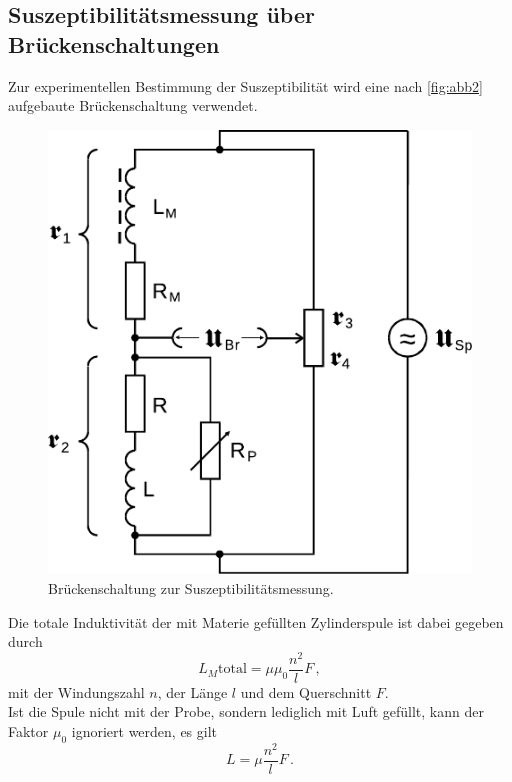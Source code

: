 \subsection{Suszeptibilitätsmessung über Brückenschaltungen}

Zur experimentellen Bestimmung der Suszeptibilität wird eine nach \autoref{fig:abb2} aufgebaute Brückenschaltung verwendet.

\begin{figure}
    \centering
    \includegraphics{figures/Abb_2.pdf}
    \caption{Brückenschaltung zur Suszeptibilitätsmessung\cite{ap07}.}
    \label{fig:abb2}
\end{figure}

Die totale Induktivität der mit Materie gefüllten Zylinderspule ist dabei gegeben durch
\begin{equation}
    L_M\text{total} = \mu \mu_0 \dfrac{n^2}{l} F \,,
    \label{eq:induspu}
\end{equation}
mit der Windungszahl $n$, der Länge $l$ und dem Querschnitt $F$. \\

Ist die Spule nicht mit der Probe, sondern lediglich mit Luft gefüllt, kann der Faktor $\mu_0$ ignoriert werden, es gilt
\begin{equation}
    L = \mu \dfrac{n^2}{l} F \,.
\end{equation} \\

